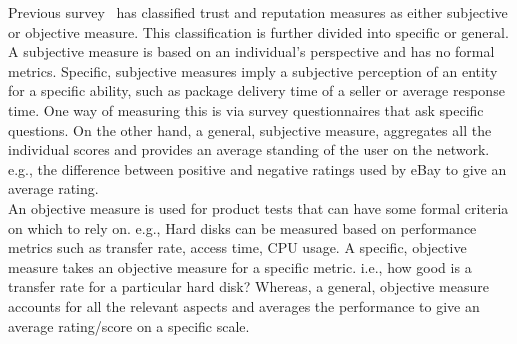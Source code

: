Previous survey~\cite{ josang2007survey} has classified trust and reputation
measures as either subjective or objective measure. This classification is
further divided into specific or general. A subjective measure is based on an
individual's perspective and has no formal metrics.  Specific, subjective
measures imply a subjective perception of an entity for a specific ability,
such as package delivery time of a seller or average response time. One way of
measuring this is via survey questionnaires that ask specific questions. On the
other hand, a general, subjective measure, aggregates all the individual scores
and provides an average standing of the user on the network.  e.g., the
difference between positive and negative ratings used by eBay to give an
average rating.\\
An objective measure is used for product tests that can have some formal
criteria on which to rely on. e.g., Hard disks can be measured based on
performance metrics such as transfer rate, access time, CPU usage. A specific,
objective measure takes an objective measure for a specific metric. i.e., how
good is a transfer rate for a particular hard disk? Whereas, a general,
objective measure accounts for all the relevant aspects and averages the
performance to give an average rating/score on a specific scale. \\

